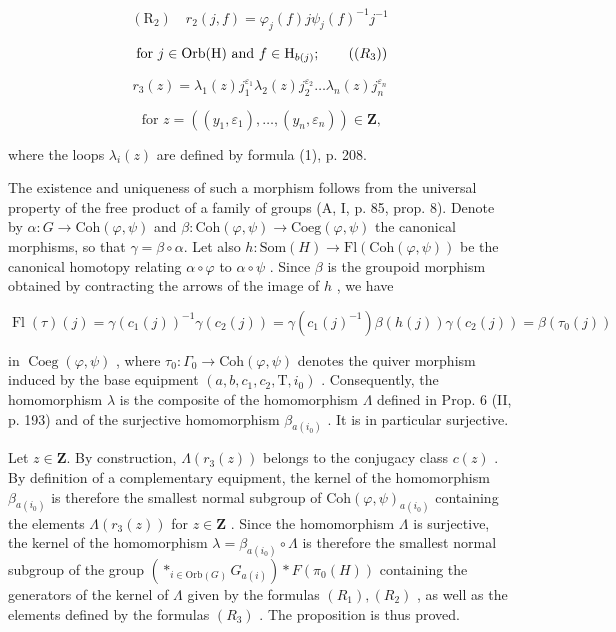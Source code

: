 \[
(\mathrm{R} _ {2}) \quad r _ {2} (j, f) = \varphi_ {j} (f) j \psi_ {j} (f) ^ {- 1} j ^ {- 1}
\]

\[
\text { for } j \in \operatorname{Orb} (\mathrm{H}) \text { and } f \in \mathrm{H} _ {b (j)};\tag{\((R_{3})\)}
\]

\[
r _ {3} (z) = \lambda_ {1} (z) j _ {1} ^ {\varepsilon_ {1}} \lambda_ {2} (z) j _ {2} ^ {\varepsilon_ {2}} \dots \lambda_ {n} (z) j _ {n} ^ {\varepsilon_ {n}}
\]

\[
\text { for } z = ((y _ {1}, \varepsilon_ {1}), \dots , (y _ {n}, \varepsilon_ {n})) \in \mathbf {Z},
\]

where the loops \(\lambda_{i}(z)\) are defined by formula (1), p. 208.

The existence and uniqueness of such a morphism follows from the universal property of the free product of a family of groups (A, I, p. 85, prop. 8). Denote by \(\alpha\colon G\to\mathrm{Coh}(\varphi,\psi)\) and \(\beta\colon\mathrm{Coh}(\varphi,\psi)\to\mathrm{Coeg}(\varphi,\psi)\) the canonical morphisms, so that \(\gamma=\beta\circ\alpha\). Let also \(h\colon\mathrm{Som}(H)\to\mathrm{Fl}(\mathrm{Coh}(\varphi,\psi))\) be the canonical homotopy relating \(\alpha\circ\varphi\) to \(\alpha\circ\psi\) . Since \(\beta\) is the groupoid morphism obtained by contracting the arrows of the image of \(h\) , we have

\[
\operatorname{Fl} (\tau) (j) = \gamma (c _ {1} (j)) ^ {- 1} \gamma (c _ {2} (j)) = \gamma (c _ {1} (j) ^ {- 1}) \beta (h (j)) \gamma (c _ {2} (j)) = \beta (\tau_ {0} (j))
\]

in \(\operatorname{Coeg}(\varphi,\psi)\) , where \(\tau_{0}\colon\Gamma_{0}\to\mathrm{Coh}(\varphi,\psi)\) denotes the quiver morphism induced by the base equipment \((a,b,c_{1},c_{2},\mathrm{T},i_{0})\) . Consequently, the homomorphism \(\lambda\) is the composite of the homomorphism \(\Lambda\) defined in Prop. 6 (II, p. 193) and of the surjective homomorphism \(\beta_{a(i_0)}\) . It is in particular surjective.

Let \(z \in \mathbf{Z}\). By construction, \(\Lambda(r_3(z))\) belongs to the conjugacy class \(c(z)\) . By definition of a complementary equipment, the kernel of the homomorphism \(\beta_{a(i_0)}\) is therefore the smallest normal subgroup of \(\mathrm{Coh}(\varphi, \psi)_{a(i_0)}\) containing the elements \(\Lambda(r_3(z))\) for \(z \in \mathbf{Z}\) . Since the homomorphism \(\Lambda\) is surjective, the kernel of the homomorphism \(\lambda = \beta_{a(i_0)} \circ \Lambda\) is therefore the smallest normal subgroup of the group \(\left( *_{i \in \mathrm{Orb}(G)} G_{a(i)} \right) * F(\pi_0(H))\) containing the generators of the kernel of \(\Lambda\) given by the formulas \((R_1), (R_2)\) , as well as the elements defined by the formulas \((R_3)\) . The proposition is thus proved.

